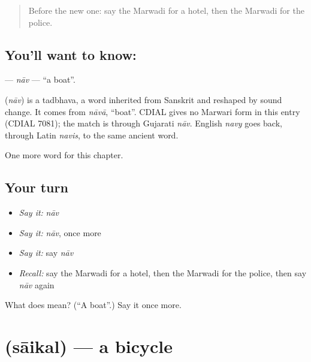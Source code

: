 \label{lesson:MW-C83-nav}



\begin{quote}
Before the new one: say the Marwadi for a hotel, then the Marwadi for the police.
\end{quote}

\subsection*{You'll want to know: }
\textbf{} — \emph{nāv} — \textquotedblleft{}a boat\textquotedblright{}.

\begin{cousinweb}
\textbf{} (\emph{nāv}) is a tadbhava, a word inherited from Sanskrit and reshaped by sound change. It comes from \emph{nāvā}, \textquotedblleft{}boat\textquotedblright{}. CDIAL gives no Marwari form in this entry (CDIAL 7081); the match is through Gujarati \emph{nāv}. English \emph{navy} goes back, through Latin \emph{navis}, to the same ancient word.
\end{cousinweb}

\begin{grammarlens}[title={What you've built}]
One more word for this chapter.
\end{grammarlens}

\subsection*{Your turn}
\begin{itemize}
\raggedright
  \item \emph{Say it:} \emph{nāv}
  \item \emph{Say it:} \emph{nāv}, once more
  \item \emph{Say it:} say \emph{nāv}
  \item \emph{Recall:} say the Marwadi for a hotel, then the Marwadi for the police, then say \emph{nāv} again
\end{itemize}

\begin{tcolorbox}[breakable,colback=teal!4,colframe=teal!35!black,title={Before you move on}]
What does  mean? (\textquotedblleft{}A boat\textquotedblright{}.) Say it once more.
\end{tcolorbox}
\section[\texorpdfstring{\mw{साइकल} (sāikal)}{साइकल (sāikal)}]{ (sāikal) — a bicycle}


